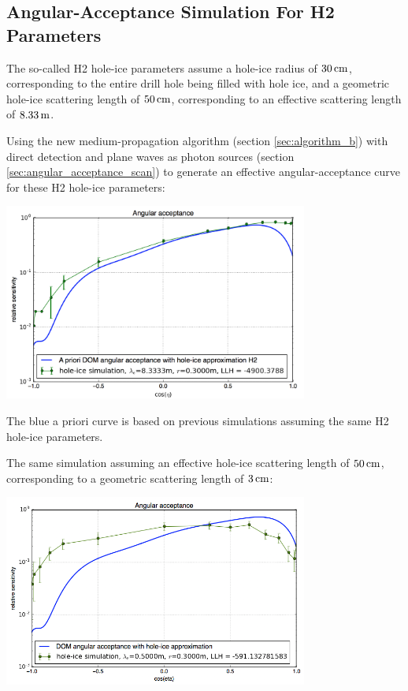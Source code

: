 \subsection{Angular-Acceptance Simulation For H2 Parameters}
\label{sec:angular_acceptance_simulation_for_h2_parameters}

The so-called H2 hole-ice parameters assume a hole-ice radius of
\(30\text{\,cm}\), corresponding to the entire drill hole being filled with hole
ice, and a geometric hole-ice scattering length of \(50\text{\,cm}\),
corresponding to an effective scattering length of \(8.33\text{\,m}\).
\cite{holeicestudieswithyag}

Using the new medium-propagation algorithm (section
\ref{sec:algorithm_b}) with direct detection and plane waves as photon
sources (section \ref{sec:angular_acceptance_scan}) to generate an
effective angular-acceptance curve for these H2 hole-ice parameters:

\hspace{1cm}

\begin{center}
  \includegraphics[width=0.75\textwidth]{img/angular-acceptance-karle-h2-vs-reference}
\end{center}

\hspace{1cm}

The blue a priori curve is based on previous \photonics simulations
assuming the same H2 hole-ice parameters. \cite{lundberg, icepaper}

\newpage

The same simulation assuming an effective hole-ice scattering length of
\(50\text{\,cm}\), corresponding to a geometric scattering length of \(3\text{\,cm}\):

\hspace{1cm}

\begin{center}
  \includegraphics[width=0.75\textwidth]{img/angular-acceptance-karle-h2-assuming-esca}
\end{center}

\hspace{1cm}

